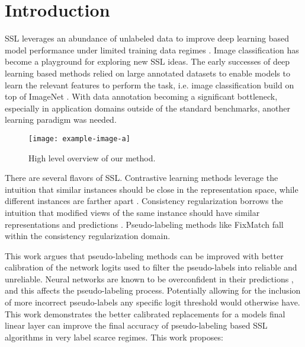 \documentclass[10pt,twocolumn,letterpaper]{article}
\begin{document}
\section{Introduction}
SSL leverages an abundance of unlabeled data to improve deep learning based model performance under limited training data regimes \cite{zhu2022introduction,li2019safe,hady2013semi}.
Image classification has become a playground for exploring new SSL ideas.
The early successes of deep learning based methods relied on large annotated datasets to enable models to learn the relevant features to perform the task, i.e. image classification build on top of ImageNet \cite{deng2009imagenet}.
With data annotation becoming a significant bottleneck, especially in application domains outside of the standard benchmarks, another learning paradigm was needed.

\begin{figure}[ht]
	\centering
	\texttt{[image: example-image-a]}
	\caption{High level overview of our method.}
	\label{fig:schema}
\end{figure}

There are several flavors of SSL.
Contrastive learning methods leverage the intuition that similar instances should be close in the representation space, while different instances are farther apart \cite{yang2022class,li2021comatch}.
Consistency regularization borrows the intuition that modified views of the same instance should have similar representations and predictions \cite{sohn2020fixmatch,lee2022contrastive,zhang2021flexmatch,kim2022conmatch}.
Pseudo-labeling methods like FixMatch \cite{sohn2020fixmatch} fall within the consistency regularization domain.

This work argues that pseudo-labeling methods can be improved with better calibration of the network logits used to filter the pseudo-labels into reliable and unreliable. 
Neural networks are known to be overconfident in their predictions \cite{wei2022mitigating}, and this affects the pseudo-labeling process. 
Potentially allowing for the inclusion of more incorrect pseudo-labels any specific logit threshold would otherwise have.
This work demonstrates the better calibrated replacements for a models final linear layer can improve the final accuracy of pseudo-labeling based SSL algorithms in very label scarce regimes. 
This work proposes:
\end{document}
